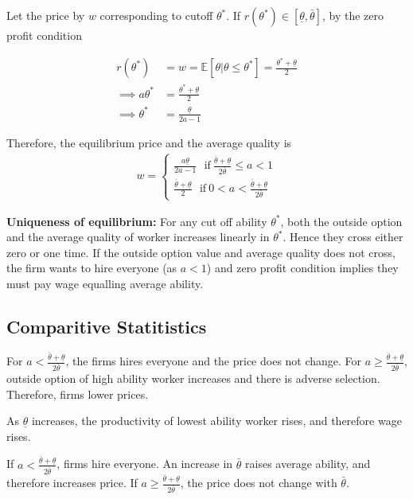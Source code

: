 Let the price by $w$ corresponding to cutoff $\theta^*$. If $r(\theta^*) \in [\underline \theta, \bar \theta]$, by the zero profit condition

\begin{align*}
    r(\theta^*) &= w = \mathbb E [\theta | \theta \le \theta^*] = \frac{\theta^* + \underline \theta}{2}\\
    \implies a \theta^* &= \frac{\theta^* + \underline \theta}{2} \\
    \implies \theta^* &= \frac{\underline \theta}{2a - 1} 
\end{align*}

Therefore, the equilibrium price and the average quality is  
\begin{align*}
    w = \begin{cases}
        \frac{a \underline \theta}{2a - 1} ~~~\text{if}~ \frac{\bar \theta + \underline \theta}{2\bar \theta} \le a < 1 \\
        \frac{\bar \theta + \underline \theta}{2}  ~~~\text{if}~ 0 < a < \frac{\bar \theta + \underline \theta}{2\bar \theta}
    \end{cases}
\end{align*}

\textbf{Uniqueness of equilibrium: } For any cut off ability $\theta^*$, both the outside option and the average quality of worker increases linearly in $\theta^*$. Hence they cross either zero or one time. If the outside option value and average quality does not cross, the firm wants to hire everyone (as $a<1$) and zero profit condition implies they must pay wage equalling average ability.

\subsection*{Comparitive Statitistics}

For $a < \frac{\bar \theta + \underline \theta}{2\bar \theta}$, the firms hires everyone and the price does not change. For $a \ge \frac{\bar \theta + \underline \theta}{2\bar \theta}$, outside option of high ability worker increases and there is adverse selection. Therefore, firms lower prices.

As $\underline \theta$ increases, the productivity of lowest ability worker rises, and therefore wage rises.

If $a < \frac{\bar \theta + \underline \theta}{2\bar \theta}$, firms hire everyone. An increase in $\bar \theta$ raises average ability, and therefore increases price. If $a \ge \frac{\bar \theta + \underline \theta}{2\bar \theta}$, the price does not change with $\bar \theta$. 


